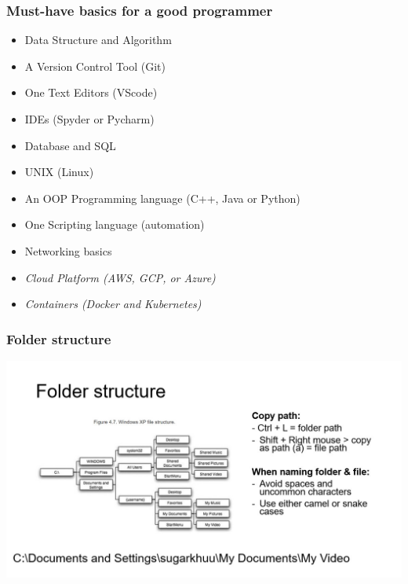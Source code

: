 \documentclass{beamer}
\begin{document}
\begin{frame}
    \frametitle{Must-have basics for a good programmer}
    \begin{itemize}
        \item Data Structure and Algorithm
        \item A Version Control Tool (Git)
        \item One Text Editors (VScode)
        \item IDEs (Spyder or Pycharm)
        \item Database and SQL
        \item UNIX (Linux)
        \item An OOP Programming language (C++, Java or Python)
        \item One Scripting language (automation)
        \item Networking basics
        \item \textit{Cloud Platform (AWS, GCP, or Azure)}
        \item \textit{Containers (Docker and Kubernetes)}
    \end{itemize}
\end{frame}

\begin{frame}
    \frametitle{Folder structure}
    \centering
    \includegraphics[scale = 0.5]{figures/folder.jpg}
\end{frame}
\end{document}
